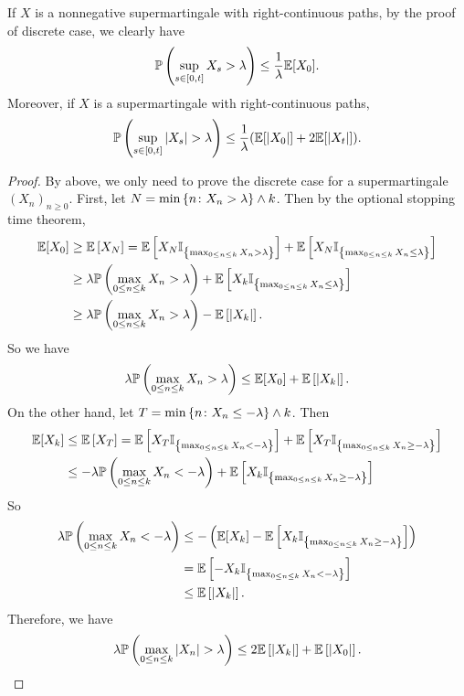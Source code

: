 \begin{rmk}
    If $X$ is a nonnegative supermartingale with right-continuous paths, by the proof of discrete case, we clearly have
    \begin{equation*}
        \mathbb{P}\left(\sup_{s \in [0,t]} X_s > \lambda\right) \leq \frac{1}{\lambda}\mathbb{E}[X_0].
    \end{equation*}
    Moreover, if $X$ is a supermartingale with right-continuous paths, 
    \begin{equation*}
        \mathbb{P}\left(\sup_{s \in [0,t]} \left\lvert X_s\right\lvert > \lambda\right) \leq \frac{1}{\lambda} (\mathbb{E}[\left\lvert X_0\right\lvert]+2\mathbb{E}[\left\lvert X_t\right\lvert]).
    \end{equation*}
    \begin{proof}
        By above, we only need to prove the discrete case for a supermartingale $(X_n)_{n \geq 0}$. First, let $N = \min \left\{ n\colon X_n > \lambda \right\} \wedge k$. Then by the optional stopping time theorem,
        \begin{align*}
            \mathbb{E}[X_0] &\geq \mathbb{E}\left[X_N\right] = \mathbb{E}\left[X_N\mathbb{I}_{\left\{\max_{0 \leq n \leq k} X_n > \lambda\right\}}\right] + \mathbb{E}\left[X_N\mathbb{I}_{\left\{\max_{0 \leq n \leq k} X_n \leq \lambda\right\}}\right] \\
            &\geq \lambda \mathbb{P}\left(\max_{0 \leq n \leq k} X_n > \lambda\right) + \mathbb{E}\left[X_k\mathbb{I}_{\left\{\max_{0 \leq n \leq k} X_n \leq \lambda\right\}}\right] \\
            &\geq \lambda \mathbb{P}\left(\max_{0 \leq n \leq k} X_n > \lambda\right) - \mathbb{E}\left[\left\lvert X_k\right\lvert\right].
        \end{align*}
        So we have
        \begin{equation*}
            \lambda \mathbb{P}\left(\max_{0 \leq n \leq k} X_n > \lambda\right) \leq \mathbb{E}[X_0] + \mathbb{E}\left[\left\lvert X_k\right\lvert\right].
        \end{equation*}
        On the other hand, let $T = \min \left\{n \colon X_n \leq -\lambda\right\} \wedge k$. Then
        \begin{align*}
            \mathbb{E}[X_k]&\leq \mathbb{E}\left[X_T\right] = \mathbb{E}\left[X_T\mathbb{I}_{\left\{\max_{0 \leq n \leq k} X_n < - \lambda\right\}}\right] + \mathbb{E}\left[X_T\mathbb{I}_{\left\{\max_{0 \leq n \leq k} X_n \geq -\lambda\right\}}\right] \\
            &\leq -\lambda \mathbb{P}\left(\max_{0 \leq n \leq k} X_n < - \lambda\right) + \mathbb{E}\left[X_k\mathbb{I}_{\left\{\max_{0 \leq n \leq k} X_n \geq -\lambda\right\}}\right] 
        \end{align*}
        So
        \begin{align*}
            \lambda \mathbb{P}\left(\max_{0 \leq n \leq k} X_n < - \lambda\right) &\leq -\left(\mathbb{E}[X_k] - \mathbb{E}\left[X_k\mathbb{I}_{\left\{\max_{0 \leq n \leq k} X_n \geq -\lambda\right\}}\right] \right) \\
            &= \mathbb{E}\left[-X_k\mathbb{I}_{\left\{\max_{0 \leq n \leq k} X_n < -\lambda\right\}}\right]\\
            &\leq \mathbb{E}\left[\left\lvert X_k\right\lvert\right].
        \end{align*}
        Therefore, we have
        \begin{equation*}
            \lambda \mathbb{P}\left(\max_{0 \leq n \leq k} \left\lvert X_n\right\lvert > \lambda\right) \leq 2\mathbb{E}\left[\left\lvert X_k\right\lvert\right] + \mathbb{E}\left[\left\lvert X_0\right\lvert\right]. \qedhere
        \end{equation*}
    \end{proof}
\end{rmk}

